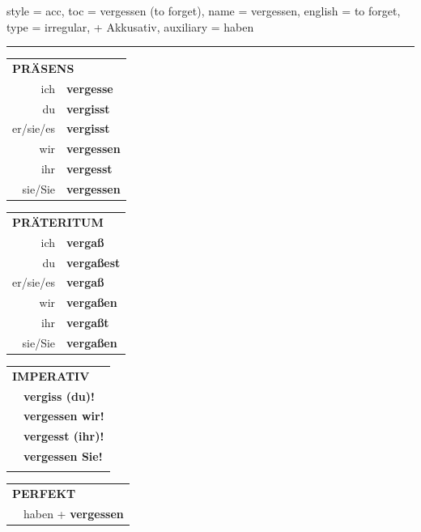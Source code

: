\begin{verbentry}{
  style = {acc},
  toc = {vergessen (to forget)},
  name = {vergessen},
  english = {to forget},
  type = {irregular, + Akkusativ},
  auxiliary = {haben}
}
 
    
     \vspace{5pt}

    \hrule
    
    \vspace{5pt}

  \begin{tabular}{rl}
     \multicolumn{2}{l}{\textbf{PRÄSENS} }\\
    ich & \textbf{vergesse}\\
    du & \textbf{vergisst}\\
    er/sie/es & \textbf{vergisst}\\
    wir & \textbf{vergessen}\\
    ihr & \textbf{vergesst}\\
    sie/Sie & \textbf{vergessen}\\
  \end{tabular}
  \hfill
     \begin{tabular}{rl}
    \multicolumn{2}{l}{\textbf{PRÄTERITUM} }\\
    ich & \textbf{vergaß}\\
    du & \textbf{vergaßest}\\
    er/sie/es & \textbf{vergaß}\\
    wir & \textbf{vergaßen}\\
    ihr & \textbf{vergaßt}\\
    sie/Sie & \textbf{vergaßen}\\
  \end{tabular}
  \hfill
  \begin{tabular}{rl}
     \multicolumn{2}{l}{\textbf{IMPERATIV} }\\
   & \textbf{vergiss (du)!}\\
   & \textbf{vergessen wir!}\\
   & \textbf{vergesst (ihr)!}\\
   & \textbf{vergessen Sie!}\\
   & \vspace{10pt}
  \end{tabular}

    \vspace{10pt}

 \begin{tabular}{rl}
     \multicolumn{2}{l}{\textbf{PERFEKT}}\\
  &  haben + \textbf{vergessen}\\
  \end{tabular}
\hfill
   \begin{tabular}{rl}
   

\end{tabular}
\end{verbentry}
